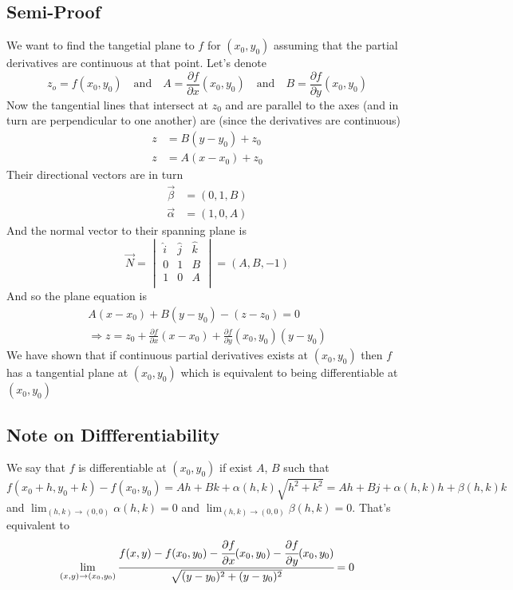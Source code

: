 \documentclass[11pt,a4paper]{article}
\theoremstyle{definition}
\theoremstyle{plain}
\begin{document}
	\subsection{Semi-Proof}
	We want to find the tangetial plane to $f$ for $(x_0,y_0)$ 
	assuming that the partial derivatives are continuous at that point. 
	Let's denote
	\[
		z_o=f(x_0,y_0)\quad\mathrm{and}\quad A = 
		\frac{\partial f}{\partial x}(x_0,y_0) \quad
		\mathrm{and} \quad B = \frac{\partial f}{\partial y}(x_0,y_0)
	\]
	Now the tangential lines that intersect at $z_0$ and are parallel 
	to the axes (and in turn are perpendicular to one another) 
	are (since the derivatives are continuous)
	\begin{align*} 
		z &=  B(y-y_0)+z_0 \\ 
		z &=  A(x-x_0)+z_0
	\end{align*}
	Their directional vectors are in turn
	\begin{align*} 
		\vec{\beta} &=  (0,1,B) \\ 
		\vec{\alpha} &=  (1,0,A)
	\end{align*}
	And the normal vector to their spanning plane is
	\[
	\vec{N} = \begin{vmatrix}
		\hat{i} & \hat{j} & \hat{k}\\
		0 & 1 & B\\
		1 & 0 & A\\
	\end{vmatrix}
	 = (A,B,-1)
	\]
	And so the plane equation is
	\begin{align*}
		A(x-x_0) + B(y-y_0) - (z-z_0) = 0 \\
		\Rightarrow z = z_0 + \frac{\partial f}{\partial x}(x-x_0) + \frac{\partial f}{\partial y}(x_0,y_0)(y-y_0)
	\end{align*}
	We have shown that if continuous partial derivatives exists at $(x_0,y_0)$ 
	then $f$ has a tangential plane at $(x_0,y_0)$ which is equivalent to 
	being differentiable at $(x_0,y_0)$
	
	\subsection{Note on Diffferentiability}
	We say that $f$ is differentiable at $(x_0,y_0)$ if exist $A$, $B$ such that
	\[
		f(x_0+h,y_0+k)-f(x_0,y_0) 
		= Ah + Bk + \alpha(h,k)\sqrt{h^2+k^2}
		= Ah + Bj + \alpha(h,k)h + \beta(h,k)k
	\]
	and $\lim_{(h,k)\to(0,0)}{\alpha(h,k)}=0$ and $\lim_{(h,k)\to (0,0)}{\beta(h,k)}=0$. That's equivalent to
	\[
		\lim_{(x,y)\to(x_0,y_0)}{\cfrac{f(x,y)-f(x_0,y_0)-\cfrac{\partial f}{\partial x}(x_0,y_0)-\cfrac{\partial f}{\partial y}(x_0,y_0)}{\sqrt{(y-y_0)^2+(y-y_0)^2}}} = 0
	\]
\end{document}

